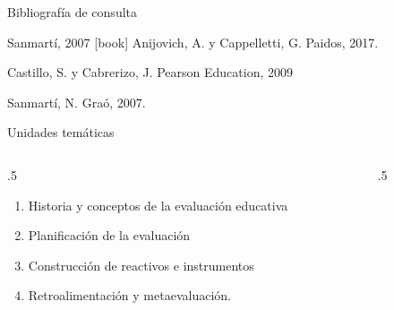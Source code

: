 \documentclass[11pt, aspectratio=169, xcolor=table]{beamer}
\begin{document}
	\begin{frame}{Bibliografía de consulta}
		\begin{thebibliography}{Sanmartí, 2007}
			[book] %
			Anijovich, A. y Cappelletti, G.
				\newblock Paidos, 2017.
			
			Castillo, S. y Cabrerizo, J.
				\newblock Pearson Education, 2009
			
			Sanmartí, N.
				\newblock Graó, 2007.
			
		\end{thebibliography}
	\end{frame}

	\begin{frame}{Unidades temáticas}
		\begin{columns}
			\begin{column}{.5\linewidth}
				\begin{block}{}
					\begin{enumerate}[<+->]
						\item Historia y conceptos de la evaluación educativa
						\item Planificación de la evaluación
						\item Construcción de reactivos e instrumentos
						\item Retroalimentación y metaevaluación.
					\end{enumerate}
				\end{block}
			\end{column}
			\begin{column}{.5\linewidth}
				\centering
			\end{column}
		\end{columns}
	\end{frame}
\end{document}
